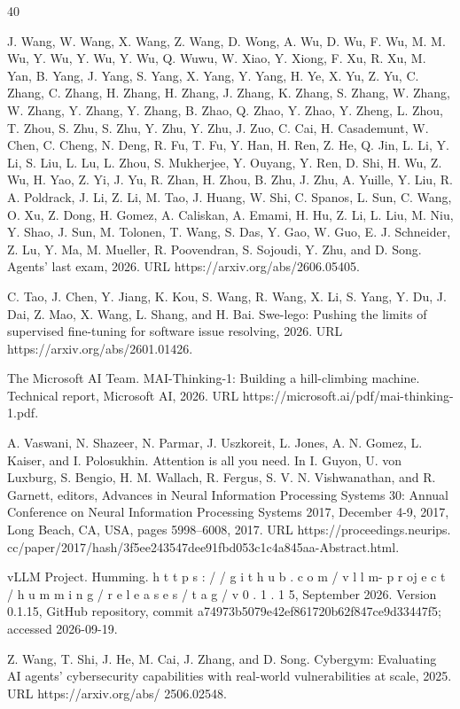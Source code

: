 \documentclass[
  10
]{article}
\begin{document}
40

J. Wang, W. Wang, X. Wang, Z. Wang, D. Wong, A. Wu, D. Wu, F. Wu, M. M.
Wu, Y. Wu, Y. Wu, Y. Wu, Q. Wuwu, W. Xiao, Y. Xiong, F. Xu, R. Xu, M.
Yan, B. Yang, J. Yang, S. Yang, X. Yang, Y. Yang, H. Ye, X. Yu, Z. Yu,
C. Zhang, C. Zhang, H. Zhang, H. Zhang, J. Zhang, K. Zhang, S. Zhang, W.
Zhang, W. Zhang, Y. Zhang, Y. Zhang, B. Zhao, Q. Zhao, Y. Zhao, Y.
Zheng, L. Zhou, T. Zhou, S. Zhu, S. Zhu, Y. Zhu, Y. Zhu, J. Zuo, C. Cai,
H. Casademunt, W. Chen, C. Cheng, N. Deng, R. Fu, T. Fu, Y. Han, H. Ren,
Z. He, Q. Jin, L. Li, Y. Li, S. Liu, L. Lu, L. Zhou, S. Mukherjee, Y.
Ouyang, Y. Ren, D. Shi, H. Wu, Z. Wu, H. Yao, Z. Yi, J. Yu, R. Zhan, H.
Zhou, B. Zhu, J. Zhu, A. Yuille, Y. Liu, R. A. Poldrack, J. Li, Z. Li,
M. Tao, J. Huang, W. Shi, C. Spanos, L. Sun, C. Wang, O. Xu, Z. Dong, H.
Gomez, A. Caliskan, A. Emami, H. Hu, Z. Li, L. Liu, M. Niu, Y. Shao, J.
Sun, M. Tolonen, T. Wang, S. Das, Y. Gao, W. Guo, E. J. Schneider, Z.
Lu, Y. Ma, M. Mueller, R. Poovendran, S. Sojoudi, Y. Zhu, and D. Song.
Agents' last exam, 2026. URL https://arxiv.org/abs/2606.05405.

C. Tao, J. Chen, Y. Jiang, K. Kou, S. Wang, R. Wang, X. Li, S. Yang, Y.
Du, J. Dai, Z. Mao, X. Wang, L. Shang, and H. Bai. Swe-lego: Pushing the
limits of supervised fine-tuning for software issue resolving, 2026. URL
https://arxiv.org/abs/2601.01426.

The Microsoft AI Team. MAI-Thinking-1: Building a hill-climbing machine.
Technical report, Microsoft AI, 2026. URL
https://microsoft.ai/pdf/mai-thinking-1.pdf.

A. Vaswani, N. Shazeer, N. Parmar, J. Uszkoreit, L. Jones, A. N. Gomez,
L. Kaiser, and I. Polosukhin. Attention is all you need. In I. Guyon, U.
von Luxburg, S. Bengio, H. M. Wallach, R. Fergus, S. V. N. Vishwanathan,
and R. Garnett, editors, Advances in Neural Information Processing
Systems 30: Annual Conference on Neural Information Processing Systems
2017, December 4-9, 2017, Long Beach, CA, USA, pages 5998--6008, 2017.
URL https://proceedings.neurips.
cc/paper/2017/hash/3f5ee243547dee91fbd053c1c4a845aa-Abstract.html.

vLLM Project. Humming. h t t p s : / / g i t h u b . c o m / v l l m- p
r oj e c t / h u m m i n g / r e l e a s e s / t a g / v 0 . 1 . 1 5,
September 2026. Version 0.1.15, GitHub repository, commit
a74973b5079e42ef861720b62f847ce9d33447f5; accessed 2026-09-19.

Z. Wang, T. Shi, J. He, M. Cai, J. Zhang, and D. Song. Cybergym:
Evaluating AI agents' cybersecurity capabilities with real-world
vulnerabilities at scale, 2025. URL https://arxiv.org/abs/ 2506.02548.
\end{document}
